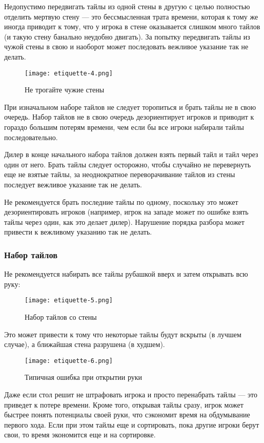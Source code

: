 Недопустимо передвигать тайлы из одной стены в другую с целью полностью отделить мертвую стену --- это бессмысленная трата времени, которая к тому же иногда приводит к тому, что у игрока в стене оказывается слишком много тайлов (и такую стену банально неудобно двигать). За попытку передвигать тайлы из чужой стены в свою и наоборот может последовать вежливое указание так не делать.

\begin{figure}[H]
	\centering
	\texttt{[image: etiquette-4.png]}
	\caption{Не трогайте чужие стены}
\end{figure}

При изначальном наборе тайлов не следует торопиться и брать тайлы не в свою очередь. Набор тайлов не в свою очередь дезориентирует игроков и приводит к гораздо большим потерям времени, чем если бы все игроки набирали тайлы последовательно.

Дилер в конце начального набора тайлов должен взять первый тайл и тайл через один от него. Брать тайлы следует осторожно, чтобы случайно не перевернуть еще не взятые тайлы, за неоднократное переворачивание тайлов из стены последует вежливое указание так не делать.

Не рекомендуется брать последние тайлы по одному, поскольку это может дезориентировать игроков (например, игрок на западе может по ошибке взять тайлы через один, как это делает дилер). Нарушение порядка разбора может привести к вежливому указанию так не делать.

\subsubsection{Набор тайлов}

Не рекомендуется набирать все тайлы рубашкой вверх и затем открывать всю руку:

\begin{figure}[H]
	\centering
	\texttt{[image: etiquette-5.png]}
	\caption{Набор тайлов со стены}
\end{figure}

Это может привести к тому что некоторые тайлы будут вскрыты (в лучшем случае), а ближайшая стена разрушена (в худшем).

\begin{figure}[H]
	\centering
	\texttt{[image: etiquette-6.png]}
	\caption{Типичная ошибка при открытии руки}
\end{figure}

Даже если стол решит не штрафовать игрока и просто перенабрать тайлы --- это приведет к потере времени. Кроме того, открывая тайлы сразу, игрок может быстрее понять потенциалы своей руки, что сэкономит время на обдумывание первого хода. Если при этом тайлы еще и сортировать, пока другие игроки берут свои, то время экономится еще и на сортировке.

